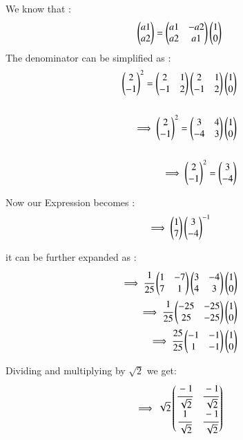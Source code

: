 \begin{enumerate}[label=\thesection.\arabic*.,ref=\thesection.\theenumi]
\begin{enumerate}
We know that :
\begin{align}
    \begin{pmatrix}a1 \\ a2\end{pmatrix} = \begin{pmatrix}a1 & -a2\\a2 & a1\end{pmatrix}\begin{pmatrix}1 \\ 0\end{pmatrix}
\end{align}
The denominator can be simplified as :
\begin{align}
    \begin{pmatrix}2 \\ -1\end{pmatrix}^2 = \begin{pmatrix}2 & 1\\-1 & 2\end{pmatrix}\begin{pmatrix}2 & 1\\-1 & 2\end{pmatrix}\begin{pmatrix}1 \\ 0\end{pmatrix}
\\ \\
    \implies \begin{pmatrix}2 \\ -1\end{pmatrix}^2 = \begin{pmatrix}3 & 4\\-4 & 3\end{pmatrix}\begin{pmatrix}1 \\ 0\end{pmatrix}
\\ \\
    \implies \begin{pmatrix}2 \\ -1\end{pmatrix}^2 = \begin{pmatrix}3 \\-4\end{pmatrix}
\end{align}

Now our Expression becomes :
\begin{align}
    \implies \begin{pmatrix}1 \\ 7\end{pmatrix}\begin{pmatrix}3\\-4\end{pmatrix}^{-1}
\end{align}

it can be further expanded as :
\begin{align}
    \implies \cfrac{1}{25}\begin{pmatrix}1 & -7\\7 & 1\end{pmatrix}\begin{pmatrix}3 & -4\\4 & 3\end{pmatrix}\begin{pmatrix}1 \\ 0\end{pmatrix}
\\
    \implies \cfrac{1}{25}\begin{pmatrix}-25 & -25\\25 & -25\end{pmatrix}\begin{pmatrix}1 \\ 0\end{pmatrix}
\\
    \implies \cfrac{25}{25}\begin{pmatrix}-1 & -1\\1 & -1\end{pmatrix}\begin{pmatrix}1 \\ 0\end{pmatrix}
\end{align}

Dividing and multiplying by $\sqrt{2}$ we get:
\begin{align}
    \implies \sqrt{2}\begin{pmatrix}\cfrac{-1}{\sqrt{2}} & \cfrac{-1}{\sqrt{2}} \\ \cfrac{1}{\sqrt{2}} & \cfrac{-1}{\sqrt{2}}\end{pmatrix}
\end{align}


\end{enumerate}
\end{enumerate}
